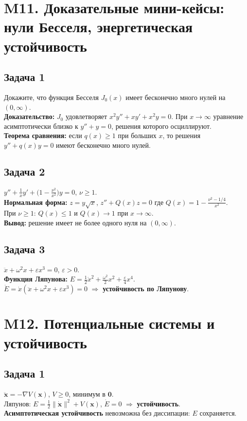 \documentclass[12pt]{article}
\begin{document}
\section*{M11. Доказательные мини-кейсы: нули Бесселя, энергетическая устойчивость}

\subsection*{Задача 1}
Докажите, что функция Бесселя $J_0(x)$ имеет бесконечно много нулей на $(0,\infty)$. \\
\textbf{Доказательство: } $J_0$ удовлетворяет $x^2y''+xy'+x^2y=0$. При $x\to\infty$ уравнение асимптотически близко к $y''+y=0$, решения которого осциллируют. \\
\textbf{Теорема сравнения: } если $q(x)\ge 1$ при больших $x$, то решения $y''+q(x)y=0$ имеют бесконечно много нулей.

\subsection*{Задача 2}
$y''+\frac{1}{x}y'+\bigl(1-\frac{\nu^2}{x^2}\bigr)y=0$, $\nu\ge1$. \\
\textbf{Нормальная форма: } $z=y\sqrt{x}$, $z''+Q(x)z=0$ где $Q(x)=1-\frac{\nu^2-1/4}{x^2}$. \\
При $\nu\ge1$: $Q(x)\le 1$ и $Q(x)\to 1$ при $x\to\infty$. \\
\textbf{Вывод: } решение имеет не более одного нуля на $(0,\infty)$.

\subsection*{Задача 3}
$\ddot x + \omega^2 x + \varepsilon x^3 = 0$, $\varepsilon>0$. \\
\textbf{Функция Ляпунова: } $E=\frac{1}{2}\dot x^2 + \frac{\omega^2}{2}x^2 + \frac{\varepsilon}{4}x^4$. \\
$\dot E = \dot x(\ddot x + \omega^2 x + \varepsilon x^3) = 0$ $\Rightarrow$ \textbf{устойчивость по Ляпунову}.

\section*{M12. Потенциальные системы и устойчивость}

\subsection*{Задача 1}
$\ddot{\mathbf x}=-\nabla V(\mathbf x)$, $V\ge0$, минимум в $\mathbf0$. \\
Ляпунов: $E=\tfrac12\|\dot{\mathbf x}\|^2+V(\mathbf x)$, $\dot E=0$ $\Rightarrow$ \textbf{устойчивость}. \\
\textbf{Асимптотическая устойчивость} невозможна без диссипации: $E$ сохраняется.
\end{document}
